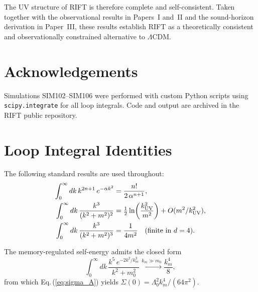 \documentclass[12pt,a4paper]{article}
\begin{document}
The UV structure of RIFT is therefore complete and self-consistent.
Taken together with the observational results in Papers~I and~II and the
sound-horizon derivation in Paper~III, these results establish RIFT as
a theoretically consistent and observationally constrained alternative
to $\Lambda$CDM.

\section*{Acknowledgements}

Simulations SIM102–SIM106 were performed with custom Python scripts
using \texttt{scipy.integrate} for all loop integrals.  Code and
output are archived in the RIFT public repository.

\appendix
\section{Loop Integral Identities}
\label{app:integrals}

The following standard results are used throughout:
\begin{align}
\int_0^\infty dk\,k^{2n+1}\,e^{-\alpha k^2}
&= \frac{n!}{2\,\alpha^{n+1}}, \\
\int_0^\infty dk\,\frac{k^3}{(k^2+m^2)^2}
&= \tfrac{1}{2}\ln\!\left(\frac{k_{\rm UV}^2}{m^2}\right)
   + O(m^2/k_{\rm UV}^2), \\
\int_0^\infty dk\,\frac{k^3}{(k^2+m^2)^3}
&= \frac{1}{4m^2}\quad\text{(finite in }d=4\text{)}.
\end{align}

The memory-regulated self-energy admits the closed form
\begin{equation}
\int_0^\infty dk\,\frac{k^5\,e^{-2k^2/k_m^2}}{k^2+m_0^2}
\xrightarrow{k_m\gg m_0}
\frac{k_m^4}{8},
\end{equation}
from which Eq.\,(\ref{eq:sigma_A}) yields
$\Sigma(0)=\Lambda_0^2 k_m^4/(64\pi^2)$.
\end{document}

